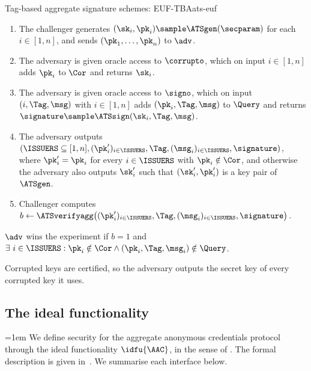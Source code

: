 \begin{experimentbox}{Tag-based aggregate signature schemes: EUF-TBA}{ats-euf}

  \begin{enumerate}

    \item The challenger generates $(\sk_i, \pk_i) \sample \ATSgen(\secparam)$ for
each $i \in [1,n]$, and sends $(\pk_1, \ldots, \pk_n)$ to $\adv$.

    \item The adversary is given oracle access to $\corrupto$, which on input $i
\in [1,n]$ adds $\pk_i$ to $\Cor$ and returns $\sk_i$.

    \item The adversary is given oracle access to $\signo$, which on input $(i,
\Tag, \msg)$ with $i \in [1,n]$ adds $(\pk_i, \Tag, \msg)$ to $\Query$ and
returns $\signature \sample \ATSsign(\sk_i, \Tag, \msg)$.

    \item The adversary outputs $(\ISSUERS \subseteq [1, n], (\pk'_i)_{i \in
\ISSUERS}, \Tag, (\msg_i)_{i \in \ISSUERS}, \signature)$, where $\pk'_i =
\pk_i$ for every $i \in \ISSUERS$ with $\pk_i \notin \Cor$, and otherwise the
adversary also outputs $\sk'_i$ such that $(\sk'_i, \pk'_i)$ is a key pair of
$\ATSgen$.

    \item Challenger computes $b \gets \ATSverifyagg\bigl((\pk'_i)_{i \in
\ISSUERS}, \Tag, (\msg_i)_{i \in \ISSUERS}, \signature\bigr)$.

  \end{enumerate}

  $\adv$ wins the experiment if $b = 1$ and $\exists \ i \in \ISSUERS : \pk_i
\notin \Cor \wedge (\pk_i, \Tag, \msg_i) \notin \Query$.

\end{experimentbox}

Corrupted keys are certified, so the adversary outputs the secret key of every
corrupted key it uses.

\subsection{The ideal functionality}

{\emergencystretch=1em
We define security for the aggregate anonymous credentials protocol through the
ideal functionality $\idfu{\AAC}$, in the sense of .
The formal description is given in~. We summarise each
interface below.\par}

